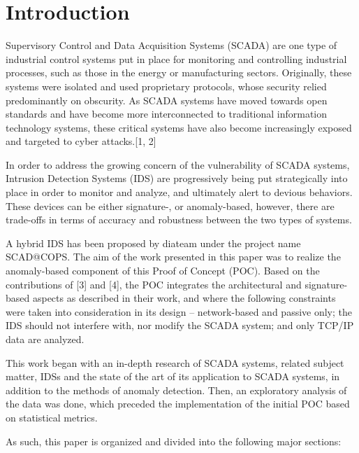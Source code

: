\documentclass[11pt,]{article}
\begin{document}
\section{Introduction}\label{introduction}

Supervisory Control and Data Acquisition Systems (SCADA) are one type of
industrial control systems put in place for monitoring and controlling
industrial processes, such as those in the energy or manufacturing
sectors. Originally, these systems were isolated and used proprietary
protocols, whose security relied predominantly on obscurity. As SCADA
systems have moved towards open standards and have become more
interconnected to traditional information technology systems, these
critical systems have also become increasingly exposed and targeted to
cyber attacks.{[}1, 2{]}

In order to address the growing concern of the vulnerability of SCADA
systems, Intrusion Detection Systems (IDS) are progressively being put
strategically into place in order to monitor and analyze, and ultimately
alert to devious behaviors. These devices can be either signature-, or
anomaly-based, however, there are trade-offs in terms of accuracy and
robustness between the two types of systems.

A hybrid IDS has been proposed by diateam under the project name
SCAD@COPS. The aim of the work presented in this paper was to realize
the anomaly-based component of this Proof of Concept (POC). Based on the
contributions of {[}3{]} and {[}4{]}, the POC integrates the
architectural and signature-based aspects as described in their work,
and where the following constraints were taken into consideration in its
design -- network-based and passive only; the IDS should not interfere
with, nor modify the SCADA system; and only TCP/IP data are analyzed.

This work began with an in-depth research of SCADA systems, related
subject matter, IDSs and the state of the art of its application to
SCADA systems, in addition to the methods of anomaly detection. Then, an
exploratory analysis of the data was done, which preceded the
implementation of the initial POC based on statistical metrics.

As such, this paper is organized and divided into the following major
sections:
\end{document}
